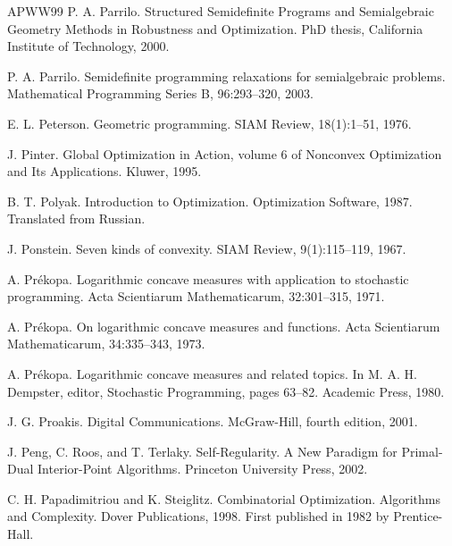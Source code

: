 \begin{thebibliography}{APWW99}
 P. A. Parrilo. Structured Semidefinite Programs and Semialgebraic Geometry Methods in Robustness and Optimization. PhD thesis, California Institute of Technology, 2000.

 P. A. Parrilo. Semidefinite programming relaxations for semialgebraic problems. Mathematical Programming Series B, 96:293–320, 2003.

 E. L. Peterson. Geometric programming. SIAM Review, 18(1):1–51, 1976.

 J. Pinter. Global Optimization in Action, volume 6 of Nonconvex Optimization and Its Applications. Kluwer, 1995.

 B. T. Polyak. Introduction to Optimization. Optimization Software, 1987. Translated from Russian.

 J. Ponstein. Seven kinds of convexity. SIAM Review, 9(1):115–119, 1967.

 A. Prékopa. Logarithmic concave measures with application to stochastic programming. Acta Scientiarum Mathematicarum, 32:301–315, 1971.

 A. Prékopa. On logarithmic concave measures and functions. Acta Scientiarum Mathematicarum, 34:335–343, 1973.

 A. Prékopa. Logarithmic concave measures and related topics. In M. A. H. Dempster, editor, Stochastic Programming, pages 63–82. Academic Press, 1980.

 J. G. Proakis. Digital Communications. McGraw-Hill, fourth edition, 2001.

 J. Peng, C. Roos, and T. Terlaky. Self-Regularity. A New Paradigm for Primal-Dual Interior-Point Algorithms. Princeton University Press, 2002.

 C. H. Papadimitriou and K. Steiglitz. Combinatorial Optimization. Algorithms and Complexity. Dover Publications, 1998. First published in 1982 by Prentice-Hall.


\end{thebibliography}
